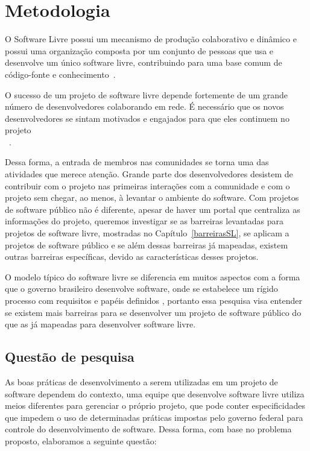 \chapter{Metodologia}
\label{metodologia}

O Software Livre possui um mecanismo de produção colaborativo e dinâmico 
e possui uma organização composta por um conjunto de pessoas que usa e desenvolve 
um único software livre, contribuindo para uma base comum de código-fonte e 
conhecimento~\cite{reis2003caracterizacc}.

O sucesso de um projeto de software livre depende fortemente de um grande número 
de desenvolvedores colaborando em rede. É necessário que os novos 
desenvolvedores se sintam motivados e engajados para que eles continuem no 
projeto\\~\cite{qureshi2010socialization}.

Dessa forma, a entrada de membros nas comunidades se torna uma das atividades que
merece atenção. Grande parte dos desenvolvedores desistem de contribuir com o 
projeto nas primeiras interações com a comunidade e com o projeto sem chegar,
ao menos, à levantar o ambiente do software.
Com projetos de software público não é diferente, apesar de haver um portal que
centraliza as informações do projeto, queremos investigar se as barreiras levantadas
para projetos de software livre, mostradas no Capítulo~\ref{barreirasSL}, se aplicam
a projetos de software público e se além dessas barreiras já mapeadas, existem outras 
barreiras específicas, devido as características desses projetos.

O modelo típico do software livre se diferencia em muitos aspectos 
com a forma que o governo brasileiro desenvolve software, onde se estabelece um 
rígido processo com requisitos e papéis definidos , portanto essa pesquisa visa entender se existem mais barreiras 
para se desenvolver um projeto de software público do que as já mapeadas para 
desenvolver software livre.



\section{Questão de pesquisa}

As boas práticas de desenvolvimento a serem utilizadas em um projeto de software 
dependem do contexto, uma equipe que desenvolve software livre utiliza
meios diferentes para gerenciar o próprio projeto, que pode conter especificidades 
que impedem o uso de determinadas práticas impostas pelo governo federal para controle
do desenvolvimento de software. 
Dessa forma, com base no problema proposto, elaboramos a seguinte questão:

